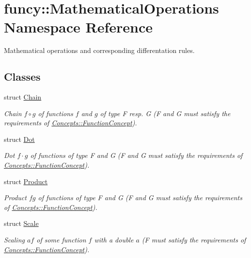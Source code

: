 \hypertarget{namespacefuncy_1_1MathematicalOperations}{\section{funcy\-:\-:Mathematical\-Operations Namespace Reference}
\label{namespacefuncy_1_1MathematicalOperations}
}


Mathematical operations and corresponding differentation rules.  


\subsection*{Classes}
\begin{DoxyCompactItemize}
\item 
struct \hyperlink{structfuncy_1_1MathematicalOperations_1_1Chain}{Chain}
\begin{DoxyCompactList}\small\item\em Chain $ f\circ g $ of functions $f$ and $g$ of type F resp. G (F and G must satisfy the requirements of \hyperlink{structfuncy_1_1Concepts_1_1FunctionConcept}{Concepts\-::\-Function\-Concept}). \end{DoxyCompactList}\item 
struct \hyperlink{structfuncy_1_1MathematicalOperations_1_1Dot}{Dot}
\begin{DoxyCompactList}\small\item\em Dot $f \cdot g$ of functions of type F and G (F and G must satisfy the requirements of \hyperlink{structfuncy_1_1Concepts_1_1FunctionConcept}{Concepts\-::\-Function\-Concept}). \end{DoxyCompactList}\item 
struct \hyperlink{structfuncy_1_1MathematicalOperations_1_1Product}{Product}
\begin{DoxyCompactList}\small\item\em Product $fg$ of functions of type F and G (F and G must satisfy the requirements of \hyperlink{structfuncy_1_1Concepts_1_1FunctionConcept}{Concepts\-::\-Function\-Concept}). \end{DoxyCompactList}\item 
struct \hyperlink{structfuncy_1_1MathematicalOperations_1_1Scale}{Scale}
\begin{DoxyCompactList}\small\item\em Scaling $ af $ of some function $ f $ with a double $ a $ (F must satisfy the requirements of \hyperlink{structfuncy_1_1Concepts_1_1FunctionConcept}{Concepts\-::\-Function\-Concept}). \end{DoxyCompactList}\item 

\end{DoxyCompactItemize}
